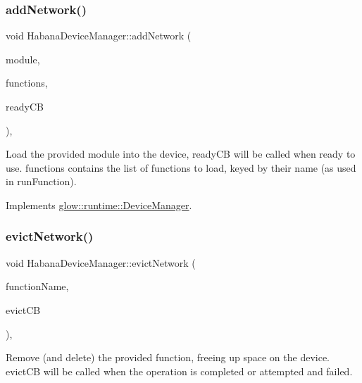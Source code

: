 \subsubsection{\texorpdfstring{add\+Network()}{addNetwork()}}
{\footnotesize\ttfamily void Habana\+Device\+Manager\+::add\+Network (\begin{DoxyParamCaption}\item[{const \hyperlink{classglow_1_1_module}{Module} $\ast$}]{module,  }\item[{Function\+Map\+Ty}]{functions,  }\item[{Ready\+C\+B\+Ty}]{ready\+CB }\end{DoxyParamCaption})\hspace{0.3cm}{\ttfamily [override]}, {\ttfamily [virtual]}}

Load the provided module into the device, ready\+CB will be called when ready to use. {\ttfamily functions} contains the list of functions to load, keyed by their name (as used in run\+Function). 

Implements \hyperlink{classglow_1_1runtime_1_1_device_manager_a9bbf9a88f8bf9ddc0ce63590580aa91f}{glow\+::runtime\+::\+Device\+Manager}.

\mbox{\label{classglow_1_1runtime_1_1_habana_device_manager_a142fa73f19c5731a522a40c2646c070e}} 
\subsubsection{\texorpdfstring{evict\+Network()}{evictNetwork()}}
{\footnotesize\ttfamily void Habana\+Device\+Manager\+::evict\+Network (\begin{DoxyParamCaption}\item[{std\+::string}]{function\+Name,  }\item[{Evict\+Function\+C\+B\+Ty}]{evict\+CB }\end{DoxyParamCaption})\hspace{0.3cm}{\ttfamily [override]}, {\ttfamily [virtual]}}

Remove (and delete) the provided function, freeing up space on the device. {\ttfamily evict\+CB} will be called when the operation is completed or attempted and failed. 


